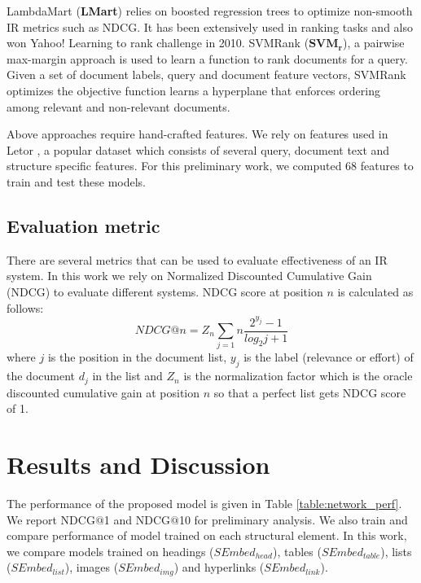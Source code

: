 \documentclass[runningheads,a4paper]{llncs}
\begin{document}
LambdaMart \cite{Burges2010Report}  (\textbf{LMart}) relies on boosted 
regression trees to optimize non-smooth IR metrics such as NDCG. It has been 
extensively used in ranking tasks and also won Yahoo! Learning to rank 
challenge \cite{Chapelle2011Yahoo} in 2010. 
SVMRank \cite{Cao2006Sigir} ({$\boldsymbol{SVM_r}$}), a pairwise max-margin 
approach is used to learn a function to rank documents for a query. Given a set 
of document labels, query and document feature vectors, 
SVMRank optimizes the objective function learns a hyperplane that 
enforces ordering among relevant and non-relevant documents. 

Above approaches require hand-crafted features. We rely on features used in 
Letor \cite{liu2007letor}, a popular dataset which consists of several query, document text 
and structure specific features. For this preliminary work, we computed 68 
features to train and test these models.

\subsection{Evaluation metric}
\label{sec:evaluation}
There are several metrics that can be used to evaluate effectiveness of an IR 
system. 
In this work we rely on Normalized Discounted Cumulative Gain (NDCG) 
\cite{Jarvelin2000NDCG} 
to evaluate different systems. NDCG score at position $n$ is calculated as 
follows: 
\begin{equation}
 NDCG@n = Z_n \sum_{j=1}{n} \frac{2^{y_j} - 1}{log_2 j + 1}
\end{equation}
where $j$ is the position in the document list, $y_j$ is the label (relevance or 
effort) of 
the document $d_j$ in the list and $Z_n$ is the normalization factor which is 
the oracle 
discounted cumulative gain at position $n$ so that a perfect list gets NDCG 
score of 1.


\section{Results and Discussion}
\label{sec:results_and_discussion}
The performance of the proposed model is given in Table \ref{table:network_perf}. 
We report NDCG$@$1 and NDCG$@$10 for preliminary analysis. We also train and compare 
performance of model trained on each structural element. In this work, we compare 
models trained on headings ($SEmbed_{head}$), tables ($SEmbed_{table}$), 
lists ($SEmbed_{list}$), images ($SEmbed_{img}$) and hyperlinks ($SEmbed_{link}$). 
\end{document}
